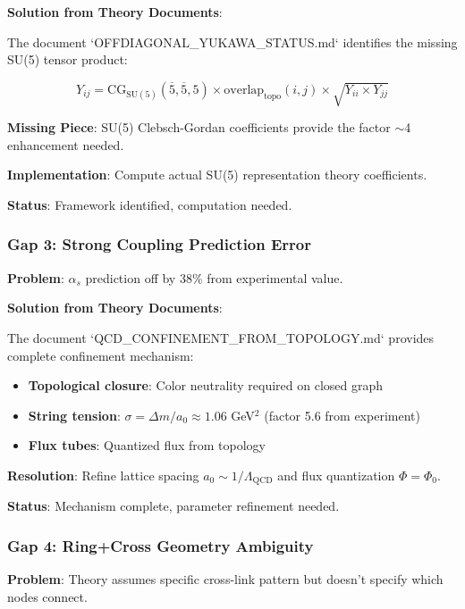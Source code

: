 \documentclass[12pt,a4paper]{article}
\begin{document}
\textbf{Solution from Theory Documents}:

The document `OFFDIAGONAL_YUKAWA_STATUS.md` identifies the missing SU(5) tensor product:

\begin{equation}
Y_{ij} = \mathrm{CG}_{\mathrm{SU(5)}}(\overline{5}, \overline{5}, 5) \times \mathrm{overlap}_{\mathrm{topo}}(i,j) \times \sqrt{Y_{ii} \times Y_{jj}}
\end{equation}

\textbf{Missing Piece}: SU(5) Clebsch-Gordan coefficients provide the factor $\sim$4 enhancement needed.

\textbf{Implementation}: Compute actual SU(5) representation theory coefficients.

\textbf{Status}: Framework identified, computation needed.

\subsubsection{Gap 3: Strong Coupling Prediction Error}

\textbf{Problem}: $\alpha_s$ prediction off by 38\% from experimental value.

\textbf{Solution from Theory Documents}:

The document `QCD_CONFINEMENT_FROM_TOPOLOGY.md` provides complete confinement mechanism:

\begin{itemize}
\item \textbf{Topological closure}: Color neutrality required on closed graph
\item \textbf{String tension}: $\sigma = \Delta m / a_0 \approx 1.06$ GeV$^2$ (factor 5.6 from experiment)
\item \textbf{Flux tubes}: Quantized flux from topology
\end{itemize}

\textbf{Resolution}: Refine lattice spacing $a_0 \sim 1/\Lambda_{\mathrm{QCD}}$ and flux quantization $\Phi = \Phi_0$.

\textbf{Status}: Mechanism complete, parameter refinement needed.

\subsubsection{Gap 4: Ring+Cross Geometry Ambiguity}

\textbf{Problem}: Theory assumes specific cross-link pattern but doesn't specify which nodes connect.
\end{document}
